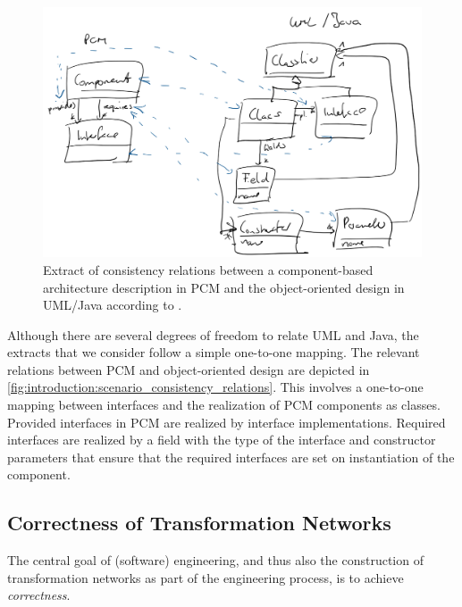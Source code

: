 \begin{figure}
    \centering
    \includegraphics[width=\textwidth]{figures/prologue/introduction/scenario_consistency_relations.png}
    \caption[Consistency relation for \acrshort{PCM} and \gls{UML}/Java]{Extract of consistency relations between a component-based architecture description in \gls{PCM} and the object-oriented design in \gls{UML}/Java according to \cite{langhammer2017a}.}
    \label{fig:introduction:scenario_consistency_relations}
\end{figure}

Although there are several degrees of freedom to relate \gls{UML} and Java, the extracts that we consider follow a simple one-to-one mapping.
The relevant relations between \gls{PCM} and object-oriented design are depicted in \autoref{fig:introduction:scenario_consistency_relations}.
This involves a one-to-one mapping between interfaces and the realization of \gls{PCM} components as classes. 
Provided interfaces in \gls{PCM} are realized by interface implementations. 
Required interfaces are realized by a field with the type of the interface and constructor parameters that ensure that the required interfaces are set on instantiation of the component.

\subsection{Correctness of Transformation Networks}

The central goal of (software) engineering, and thus also the construction of transformation networks as part of the engineering process, is to achieve \emph{correctness}.

